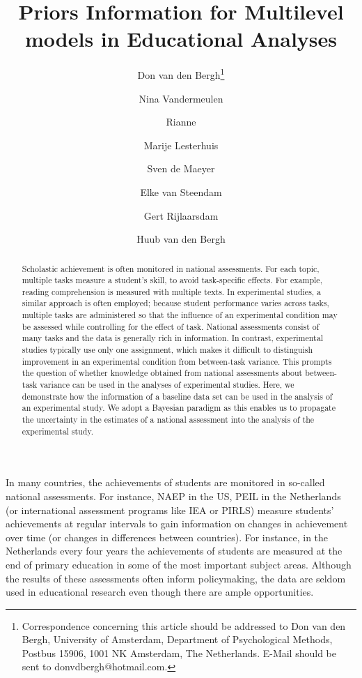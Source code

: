 \documentclass[a4paper]{article}
\author[1]{Don van den Bergh\thanks{Correspondence concerning this article should be addressed to
Don van den Bergh, University of Amsterdam, Department of Psychological Methods, Postbus 15906, 1001 NK Amsterdam, The Netherlands. E-Mail should be sent to donvdbergh@hotmail.com.}}
\author[2]{Nina Vandermeulen}
\author[2]{Rianne}
\author[2]{Marije Lesterhuis}
\author[2]{Sven de Maeyer}
\author[2]{Elke van Steendam}
\author[2]{Gert Rijlaarsdam}
\author[3]{Huub van den Bergh}
\affil[1]{University of Amsterdam}
\affil[2]{University of Antwerp}
\affil[3]{University of Utrecht}
\title{Priors Information for Multilevel models in Educational Analyses}
\date{}
\newcommand{\DONa}	[1]		{}
\renewcommand{\thefootnote}{\fnsymbol{footnote}}
\begin{document}
\newpage
\maketitle
\renewcommand{\thefootnote}{\arabic{footnote}}

\begin{abstract}
    Scholastic achievement is often monitored in national assessments. For each topic, multiple tasks measure a student's skill, to avoid task-specific effects. For example, reading comprehension is measured with multiple texts. In experimental studies, a similar approach is often employed; because student performance varies across tasks, multiple tasks are administered so that the influence of an experimental condition may be assessed while controlling for the effect of task. National assessments consist of many tasks and the data is generally rich in information. In contrast, experimental studies typically use only one assignment, which makes it difficult to distinguish improvement in an experimental condition from between-task variance. This prompts the question of whether knowledge obtained from national assessments about between-task variance can be used in the analyses of experimental studies. Here, we demonstrate how the information of a baseline data set can be used in the analysis of an experimental study. We adopt a Bayesian paradigm as this enables us to propagate the uncertainty in the estimates of a national assessment into the analysis of the experimental study.
\end{abstract}
\newpage
\DONa{Misschien moeten we een naam verzinnen voor deze methode?}

In many countries, the achievements of students are monitored in so-called national assessments. For instance, NAEP in the US, PEIL in the Netherlands (or international assessment programs like IEA or PIRLS) measure students' achievements at regular intervals to gain information on changes in achievement over time (or changes in differences between countries). For instance, in the Netherlands every four years the achievements of students are measured at the end of primary education in some of the most important subject areas. Although the results of these assessments often inform policymaking, the data are seldom used in educational research even though there are ample opportunities.
\end{document}
